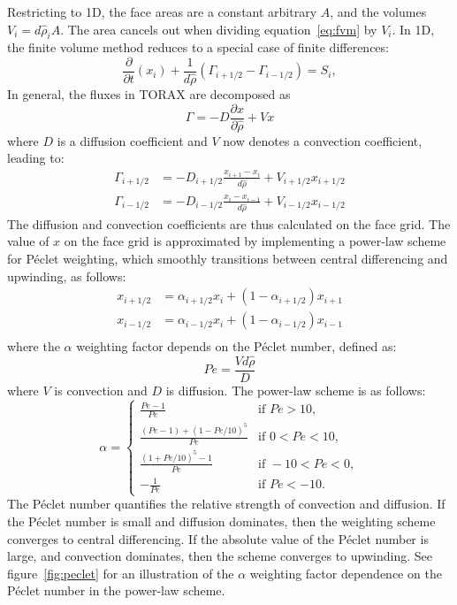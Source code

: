 \documentclass[aps, reprint, nofootinbib]{revtex4-2}
\newcommand{\rnorm}{\hat{\rho}}
\begin{document}
Restricting to 1D, the face areas are a constant arbitrary $A$, and the volumes $V_i=d\rnorm_i A$. The area cancels out when dividing equation~\ref{eq:fvm} by $V_i$.
In 1D, the finite volume method reduces to a special case of finite differences:
\begin{equation}
\label{eq:basicPDE}
\frac{\partial }{\partial t}(x_i) + \frac{1}{d \rnorm}({\Gamma}_{i+1/2} - {\Gamma}_{i-1/2})  = S_i, \end{equation}
In general, the fluxes in TORAX are decomposed as
\begin{equation}
\Gamma = -D\frac{\partial x}{\partial \rnorm} + Vx
\end{equation}
where $D$ is a diffusion coefficient and $V$ now denotes a convection coefficient, leading to:
\begin{equation}
\label{eq:fluxes}
\begin{aligned}
\Gamma_{i+1/2} &= -D_{i+1/2}\frac{x_{i+1} - x_{i}}{d\rnorm} + V_{i+1/2}x_{i+1/2} \\
\Gamma_{i-1/2} &= -D_{i-1/2}\frac{x_{i} - x_{i-1}}{d\rnorm} + V_{i-1/2}x_{i-1/2}
\end{aligned}
\end{equation}
The diffusion and convection coefficients are thus calculated on the face grid. 
The value of $x$ on the face grid is approximated by implementing a power-law scheme for P\'{e}clet weighting, which smoothly transitions between central differencing and upwinding, as follows:
\begin{equation}
\label{eq:facevalues}
\begin{aligned}
x_{i+1/2} &= \alpha_{i+1/2}x_i + (1 - \alpha_{i+1/2}) x_{i+1} \\
x_{i-1/2} &= \alpha_{i-1/2}x_i + (1 - \alpha_{i-1/2}) x_{i-1} \\
\end{aligned}
\end{equation}
where the $\alpha$ weighting factor depends on the P\'{e}clet number, defined as:
\begin{equation}
Pe = \frac{V d \rnorm}{D}
\end{equation}
where $V$ is convection and $D$ is diffusion. The power-law scheme is as follows:
\begin{equation}
\label{eq:alpha}
\alpha = \begin{cases}
\frac{Pe - 1}{Pe}  & \text{if } Pe > 10, \\
\frac{(Pe - 1) + (1 - Pe/10)^5}{Pe} & \text{if } 0 < Pe < 10, \\
\frac{(1 + Pe/10)^5 - 1}{Pe} & \text{if } -10 < Pe < 0, \\
-\frac{1}{Pe} & \text{if } Pe < -10.
\end{cases}
\end{equation}
The P\'{e}clet number quantifies the relative strength of convection and diffusion. If the P\'{e}clet number is small and diffusion dominates, then the weighting scheme converges to central differencing. If the absolute value of the P\'{e}clet number is large, and convection dominates, then the scheme converges to upwinding. See figure~\ref{fig:peclet} for an illustration of the $\alpha$ weighting factor dependence on the P\'{e}clet number in the power-law scheme.
\end{document}
